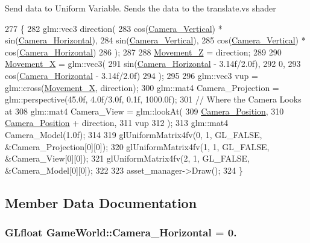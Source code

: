 Send data to Uniform Variable. Sends the data to the translate.\+vs shader
\begin{DoxyCode}
277                      \{
282         glm::vec3 direction(
283         cos(\hyperlink{classGameWorld_a26658e739c4d267b1be35ed820089931}{Camera\_Vertical}) * sin(\hyperlink{classGameWorld_a7f4911dda9b3b4e4eb03ece87e16cd96}{Camera\_Horizontal}),
284         sin(\hyperlink{classGameWorld_a26658e739c4d267b1be35ed820089931}{Camera\_Vertical}),
285         cos(\hyperlink{classGameWorld_a26658e739c4d267b1be35ed820089931}{Camera\_Vertical}) * cos(\hyperlink{classGameWorld_a7f4911dda9b3b4e4eb03ece87e16cd96}{Camera\_Horizontal})
286     );
287 
288     \hyperlink{classGameWorld_a8dd30ba92e7fa9b9b05075e31d1e7dd8}{Movement\_Z} = direction;
289 
290     \hyperlink{classGameWorld_a968eb29424b68f7cd79a5896c62e944d}{Movement\_X} = glm::vec3(
291         sin(\hyperlink{classGameWorld_a7f4911dda9b3b4e4eb03ece87e16cd96}{Camera\_Horizontal} - 3.14f/2.0f),
292         0,
293         cos(\hyperlink{classGameWorld_a7f4911dda9b3b4e4eb03ece87e16cd96}{Camera\_Horizontal} - 3.14f/2.0f)
294     );
295 
296     glm::vec3 vup = glm::cross(\hyperlink{classGameWorld_a968eb29424b68f7cd79a5896c62e944d}{Movement\_X}, direction);
300     glm::mat4 Camera\_Projection = glm::perspective(45.0f, 4.0f/3.0f, 0.1f, 1000.0f);
301         \textcolor{comment}{// Where the Camera Looks at}
308 \textcolor{comment}{}    glm::mat4 Camera\_View = glm::lookAt(
309         \hyperlink{classGameWorld_ad80e597474ea4c52a583e81788187571}{Camera\_Position},
310         \hyperlink{classGameWorld_ad80e597474ea4c52a583e81788187571}{Camera\_Position} + direction,
311         vup
312     );
313     glm::mat4 Camera\_Model(1.0f);
314 
319     glUniformMatrix4fv(0, 1, GL\_FALSE, &Camera\_Projection[0][0]);
320     glUniformMatrix4fv(1, 1, GL\_FALSE, &Camera\_View[0][0]);
321     glUniformMatrix4fv(2, 1, GL\_FALSE, &Camera\_Model[0][0]);
322 
323         asset\_manager->Draw();
324 \}
\end{DoxyCode}


\subsection{Member Data Documentation}
\hypertarget{classGameWorld_a7f4911dda9b3b4e4eb03ece87e16cd96}{}
\subsubsection[{Camera\+\_\+\+Horizontal}]{\setlength{\rightskip}{0pt plus 5cm}G\+Lfloat Game\+World\+::\+Camera\+\_\+\+Horizontal = 0.}\label{classGameWorld_a7f4911dda9b3b4e4eb03ece87e16cd96}
\hypertarget{classGameWorld_ad80e597474ea4c52a583e81788187571}{}
